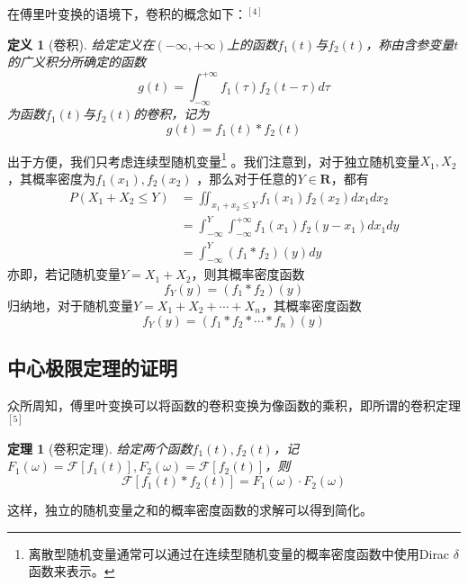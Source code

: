 \documentclass[a4paper]{ctexart}
\newtheorem{thm}{定理}
\newtheorem{definition}{定义}
\begin{document}
    在傅里叶变换的语境下，卷积的概念如下：$^{[4]}$
    \begin{definition}[卷积]\label{def:colvu}
        给定定义在$(-\infty,+\infty)$上的函数$f_{1}(t)$与$f_{2}(t)$，称由含参变量$t$的广义积分所确定的函数
        \begin{equation}\label{eq:colvu}
          g(t) = \int_{-\infty}^{+\infty}f_{1}(\tau)f_{2}(t-\tau)d\tau
        \end{equation}
        为函数$f_{1}(t)$与$f_{2}(t)$的卷积，记为
        \begin{equation*}
          g(t) = f_{1}(t) \ast f_{2}(t)
        \end{equation*}
    \end{definition}


    出于方便，我们只考虑连续型随机变量\footnote{离散型随机变量通常可以通过在连续型随机变量的概率密度函数中使用Dirac $\delta$ 函数来表示。} 。我们注意到，对于独立随机变量$X_{1},X_{2}$，其概率密度为$f_{1}(x_{1}),f_{2}(x_{2})$ ，那么对于任意的$Y\in \textbf{R}$，都有
    \begin{align}\label{eq:randsum}
      P(X_{1}+X_{2}\le Y) &= \iint_{x_{1}+x_{2}\le Y}f_{1}(x_{1})f_{2}(x_{2})dx_{1}dx_{2} \nonumber\\
       &= \int_{-\infty}^{Y}\int_{-\infty}^{+\infty}f_{1}(x_{1})f_{2}(y-x_{1})dx_{1}dy \nonumber\\
       &= \int_{-\infty}^{Y}(f_{1}\ast f_{2})(y)dy
    \end{align}
    亦即，若记随机变量$Y=X_{1}+X_{2}$，则其概率密度函数
    \begin{equation}\label{eq:randsumcolvu}
      f_{Y}(y) = (f_{1}\ast f_{2})(y)
    \end{equation}
    归纳地，对于随机变量$Y=X_{1}+X_{2}+\cdots+X_{n}$，其概率密度函数
    \begin{equation}\label{eq:randsumscolvu}
      f_{Y}(y) = (f_{1}\ast f_{2} \ast \cdots \ast f_{n})(y)
    \end{equation}

\subsection{中心极限定理的证明}
    众所周知，傅里叶变换可以将函数的卷积变换为像函数的乘积，即所谓的卷积定理$^{[5]}$
    \begin{thm}[卷积定理]\label{thm:colvu}
        给定两个函数$f_{1}(t),f_{2}(t)$，记$F_{1}(\omega)=\mathcal{F} [f_{1}(t)],F_{2}(\omega)=\mathcal{F} [f_{2}(t)]$，则
        \begin{equation}\label{eq:colvuthm}
          \mathcal{F} [f_{1}(t) \ast f_{2}(t)] = F_{1}(\omega)\cdot F_{2}(\omega)
        \end{equation}
    \end{thm}
    这样，独立的随机变量之和的概率密度函数的求解可以得到简化。
\end{document}
